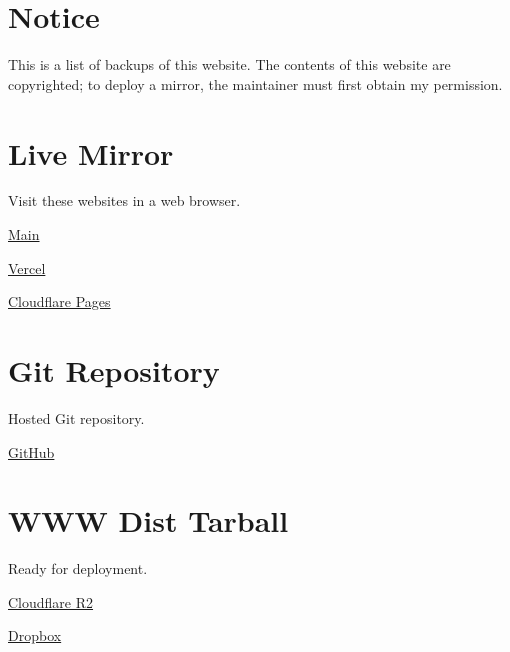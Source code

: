 




\section*{Notice}

This is a list of backups of this website.
The contents of this website are copyrighted; to deploy a mirror, the maintainer must first obtain my permission.

\section*{Live Mirror}

Visit these websites in a web browser.

\begin{compactitem}
    \item \href{https://neruthes.xyz/}{Main}
    \item \href{https://neruthes.vercel.app/}{Vercel}
    \item \href{https://neruthes.pages.dev/}{Cloudflare Pages}
\end{compactitem}

\section*{Git Repository}

Hosted Git repository.

\begin{compactitem}
    \item \href{https://github.com/neruthes/homepage-gen3}{GitHub}
\end{compactitem}

\section*{WWW Dist Tarball}

Ready for deployment.

\begin{compactitem}
    \item \href{https://pub-714f8d634e8f451d9f2fe91a4debfa23.r2.dev/o/wwwdist.tar--00ef643fb4afb6610f3adbbb0ac4fc7c.tar}{Cloudflare R2}
    \item \href{https://www.dropbox.com/s/x7qxeceaaytbkui/wwwdist.tar?dl=0}{Dropbox}
\end{compactitem}

